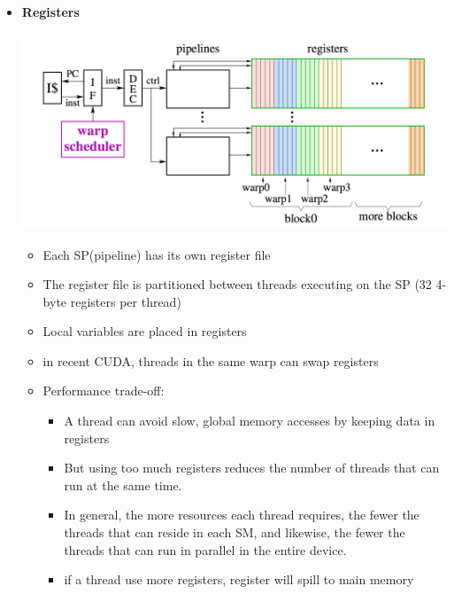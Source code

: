 \documentclass[../main.tex]{subfiles}
\begin{document}
\begin{itemize}
	\item \textbf{Registers}
	      \begin{center}
		      \includegraphics[scale=0.25]{images/register.png}
	      \end{center}
	      \begin{itemize}
		      \item Each SP(pipeline) has its own register file
		      \item The register file is partitioned between threads executing on the SP (32 4-byte registers per thread)
		      \item Local variables are placed in registers
		      \item in recent CUDA, threads in the same warp can swap registers
		      \item Performance trade-off:
		            \begin{itemize}
			            \item A thread can avoid slow, global memory accesses by keeping data in registers
			            \item But using too much registers reduces the number of threads that can run at the same time.
			            \item %
			                  In general, the more resources each thread requires, the fewer the threads that can reside in each SM, and likewise, the fewer the threads that can run in parallel in the entire device. %
			            \item if a thread use more registers, register will spill to main memory %
		            \end{itemize}
	      \end{itemize}

\end{itemize}
\end{document}
